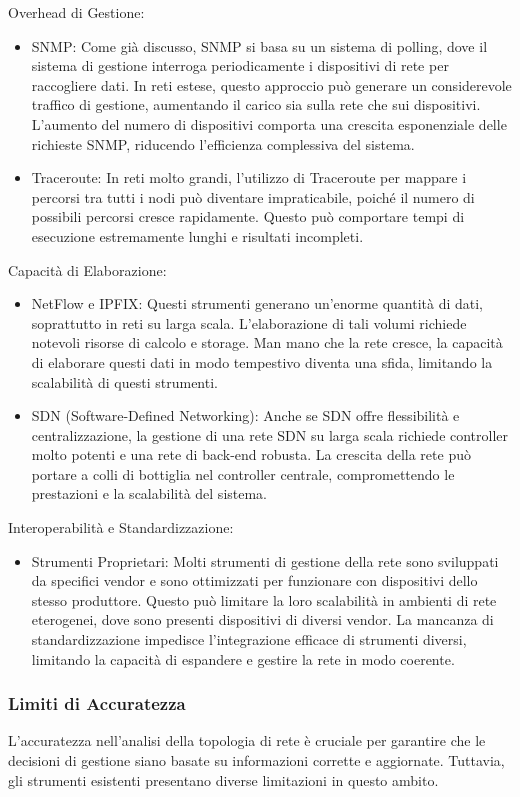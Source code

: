 \documentclass[target=bach,aauheader=,style=]{thud}
\begin{document}
Overhead di Gestione:
\begin{itemize}
  \item SNMP: Come già discusso, SNMP si basa su un sistema di polling, dove il sistema di gestione interroga periodicamente i dispositivi di rete per raccogliere dati. In reti estese, questo approccio può generare un considerevole traffico di gestione, aumentando il carico sia sulla rete che sui dispositivi. L'aumento del numero di dispositivi comporta una crescita esponenziale delle richieste SNMP, riducendo l'efficienza complessiva del sistema.
  \item Traceroute: In reti molto grandi, l'utilizzo di Traceroute per mappare i percorsi tra tutti i nodi può diventare impraticabile, poiché il numero di possibili percorsi cresce rapidamente. Questo può comportare tempi di esecuzione estremamente lunghi e risultati incompleti.
\end{itemize}
Capacità di Elaborazione:
\begin{itemize}
  \item NetFlow e IPFIX: Questi strumenti generano un'enorme quantità di dati, soprattutto in reti su larga scala. L'elaborazione di tali volumi richiede notevoli risorse di calcolo e storage. Man mano che la rete cresce, la capacità di elaborare questi dati in modo tempestivo diventa una sfida, limitando la scalabilità di questi strumenti.
  \item SDN (Software-Defined Networking): Anche se SDN offre flessibilità e centralizzazione, la gestione di una rete SDN su larga scala richiede controller molto potenti e una rete di back-end robusta. La crescita della rete può portare a colli di bottiglia nel controller centrale, compromettendo le prestazioni e la scalabilità del sistema.
\end{itemize}
Interoperabilità e Standardizzazione:
\begin{itemize}
  \item Strumenti Proprietari: Molti strumenti di gestione della rete sono sviluppati da specifici vendor e sono ottimizzati per funzionare con dispositivi dello stesso produttore. Questo può limitare la loro scalabilità in ambienti di rete eterogenei, dove sono presenti dispositivi di diversi vendor. La mancanza di standardizzazione impedisce l'integrazione efficace di strumenti diversi, limitando la capacità di espandere e gestire la rete in modo coerente.
\end{itemize}

\subsubsection{Limiti di Accuratezza}
L'accuratezza nell'analisi della topologia di rete è cruciale per garantire che le decisioni di gestione siano basate su informazioni corrette e aggiornate. Tuttavia, gli strumenti esistenti presentano diverse limitazioni in questo ambito.
\end{document}
